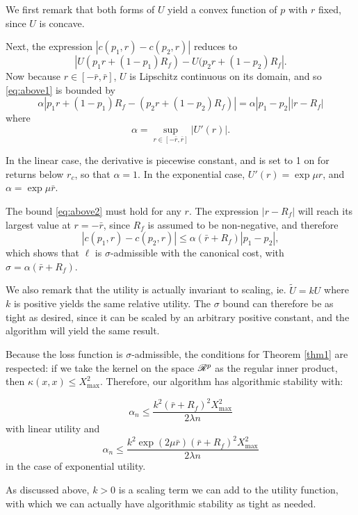 \begin{rem}
  We first remark that both forms of $U$ yield a convex function of $p$ with $r$ fixed,
  since $U$ is concave. 

  Next, the expression $|c(p_1,r)-c(p_2,r)|$ reduces to
  \begin{equation}
    \label{eq:above1} |U(p_1r + (1-p_1)R_f) - U(p_2r + (1-p_2)R_f|.
  \end{equation} Now because $r\in[-\bar r,\bar r]$, $U$ is Lipschitz continuous on its
  domain, and so \eqref{eq:above1} is bounded by
  \begin{equation}
    \label{eq:above2} \alpha |p_1r + (1-p_1)R_f - (p_2r + (1-p_2)R_f)| =
\alpha|p_1-p_2||r-R_f|
  \end{equation} where
  \begin{equation} \alpha = \sup_{r\in[-\bar r,\bar r]} |U'(r)|.
  \end{equation}

  In the linear case, the derivative is piecewise constant, and is set to 1 on for returns
below $r_c$, so that $\alpha=1$. In the exponential case, $U'(r) = \exp\mu r$, and $\alpha
= \exp \mu \bar r$.

  The bound \eqref{eq:above2} must hold for any $r$. The expression $|r-R_f|$ will reach
  its largest value at $r=-\bar r$, since $R_f$ is assumed to be non-negative, and
  therefore 
  \begin{equation}
    |c(p_1,r) - c(p_2,r)| \leq \alpha (\bar r + R_f)|p_1-p_2|,
  \end{equation}
  which shows that $\ell$ is $\sigma$-admissible with the canonical cost, with
  $\sigma=\alpha(\bar r+ R_f)$.

  We also remark that the utility is actually invariant to scaling, ie. $\tilde{U} = kU$
  where $k$ is positive yields the same relative utility. The $\sigma$ bound can therefore
  be as tight as desired, since it can be scaled by an arbitrary positive constant, and
  the algorithm will yield the same result.
\end{rem}

\begin{rem}
  Because the loss function is $\sigma$-admissible, the conditions for Theorem \ref{thm1}
  are respected: if we take the kernel on the space $\mathscr{R}^p$ as the regular inner
  product, then $\kappa(x,x)\leq X^2_{\max}$. Therefore, our algorithm has algorithmic
  stability with:

  \begin{equation}
    \alpha_n \leq \frac{k^2(\bar r+R_f)^2X^2_{\max}}{2\lambda n}
  \end{equation}
  with linear utility and
  \begin{equation}
    \alpha_n \leq \frac{k^2 \exp(2\mu\bar r)(\bar r + R_f)^2 X^2_{\max}}{2\lambda n}
  \end{equation}
  in the case of exponential utility.

  As discussed above, $k>0$ is a scaling term we can add to the utility function, with
  which we can actually have algorithmic stability as tight as needed. 
\end{rem}

